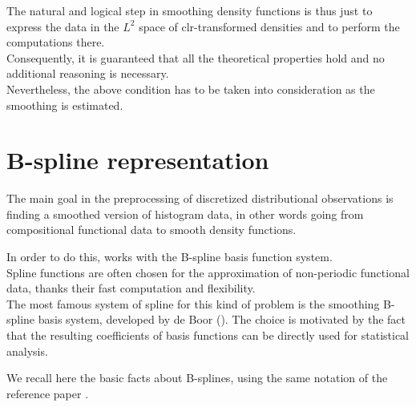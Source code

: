 The natural and logical step in smoothing density functions is thus just to express the data in the $\textit{L}^2$ space of clr-transformed densities and to perform the computations there. \\
Consequently, it is guaranteed that all the theoretical properties hold and no additional reasoning is necessary. \\
Nevertheless, the above condition has to be taken into consideration as the smoothing is estimated. 


\section{B-spline representation}
The main goal in the preprocessing of discretized distributional observations is finding a smoothed version of histogram data, in other words going from compositional functional data to smooth density functions. 

In order to do this, \citep{paper:pacs} works with the B-spline basis function system. \\
Spline functions are often chosen for the approximation of non-periodic functional data, thanks their fast computation and flexibility. \\
The most famous system of spline for this kind of problem is the smoothing B-spline basis system, developed by de Boor (\cite{ramsay:FDA}). The choice is motivated by the fact that the resulting coefficients of basis functions can be directly used for statistical analysis. 

We recall here the basic facts about B-splines, using the same notation of the reference paper \citep{paper:pacs}.


